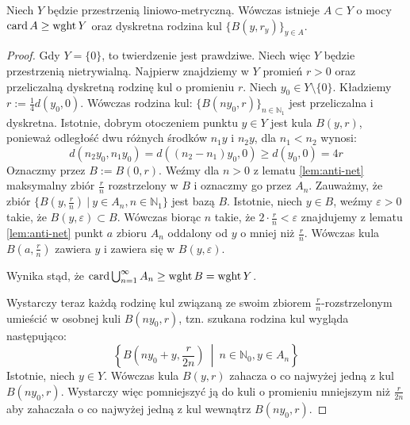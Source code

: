 \begin{lem} \label{lem:balls-many}
  Niech $Y$ będzie przestrzenią liniowo-metryczną. Wówczas istnieje $A \subset Y$ o mocy $\operatorname{card} A \geq \operatorname{wght} Y$ oraz dyskretna rodzina kul $\{B(y, r_y)\}_{y \in A}$.
  
  \begin{proof}
    Gdy $Y = \{0\}$, to twierdzenie jest prawdziwe. Niech więc $Y$ będzie przestrzenią nietrywialną.
    Najpierw znajdziemy w $Y$ promień $r > 0$ oraz przeliczalną dyskretną rodzinę kul o promieniu $r$. Niech $y_0 \in Y\setminus\{0\}$. Kładziemy $r := \frac{1}{4} d(y_0,0)$. Wówczas rodzina kul: $\{B(ny_0, r)\}_{n \in \mathbb{N}_1}$ jest przeliczalna i dyskretna. Istotnie, dobrym otoczeniem punktu $y \in Y$ jest kula $B(y,r)$, ponieważ odległość dwu różnych środków $n_1 y$ i $n_2 y$, dla $n_1 < n_2$ wynosi:
    \[
      d(n_2 y_0, n_1 y_0) = d((n_2 - n_1)y_0, 0) \geq d(y_0, 0) = 4r
    \]
    Oznaczmy przez $B := B(0,r)$. Weźmy dla $n > 0$ z lematu \ref{lem:anti-net} maksymalny zbiór $\frac{r}{n}$ rozstrzelony w $B$ i oznaczmy go przez $A_n$. Zauważmy, że zbiór $\{B(y, \frac{r}{n})\ |\ y \in A_n, n \in \mathbb{N}_1\}$ jest bazą $B$. Istotnie, niech $y \in B$, weźmy $\varepsilon > 0$ takie, że $B(y,\varepsilon) \subset B$. Wówczas biorąc $n$ takie, że $2 \cdot \frac{r}{n} < \varepsilon$ znajdujemy z lematu \ref{lem:anti-net} punkt $a$ zbioru $A_n$ oddalony od $y$ o mniej niż $\frac{r}{n}$. Wówczas kula $B(a, \frac{r}{n})$ zawiera $y$ i zawiera się w $B(y,\varepsilon)$.
    
    Wynika stąd, że $\operatorname{card} \bigcup_{n=1}^\infty A_n \geq \operatorname{wght} B = \operatorname{wght} Y$.
    
    Wystarczy teraz każdą rodzinę kul związaną ze swoim zbiorem $\frac{r}{n}$-rozstrzelonym umieścić w osobnej kuli $B(ny_0, r)$, tzn. szukana rodzina kul wygląda następująco:
    \[
      \left\{B\left(ny_0 + y, \frac{r}{2n}\right)\ \middle|\ n \in \mathbb{N}_0, y \in A_n\right\}
    \]
    Istotnie, niech $y \in Y$. Wówczas kula $B(y,r)$ zahacza o co najwyżej jedną z kul $B(ny_0, r)$. Wystarczy więc pomniejszyć ją do kuli o promieniu mniejszym niż $\frac{r}{2n}$ aby zahaczała o co najwyżej jedną z kul wewnątrz $B(ny_0, r)$.
  \end{proof}
\end{lem}

